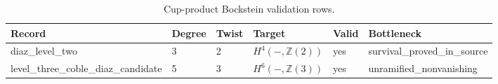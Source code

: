 \begin{table}[h]
\centering
\caption{Cup-product Bockstein validation rows.}
\label{tab:cup-product-validation}
\footnotesize
\begin{tabular}{|p{}|p{}|p{}|p{}|p{}|p{}|}
\hline
Record & Degree & Twist & Target & Valid & Bottleneck \\
\hline
diaz\_\allowbreak{}level\_\allowbreak{}two & 3 & 2 & $H^4(-,\mathbb{Z}(2))$ & yes & survival\_\allowbreak{}proved\_\allowbreak{}in\_\allowbreak{}source \\
level\_\allowbreak{}three\_\allowbreak{}coble\_\allowbreak{}diaz\_\allowbreak{}candidate & 5 & 3 & $H^6(-,\mathbb{Z}(3))$ & yes & unramified\_\allowbreak{}nonvanishing \\
\hline
\end{tabular}
\end{table}
